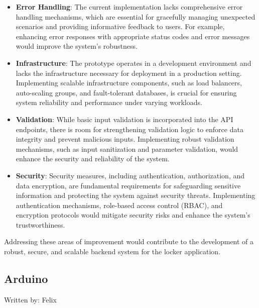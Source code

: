 \begin{itemize}
    \item \textbf{Error Handling}: The current implementation lacks comprehensive error handling mechanisms, which are essential for gracefully managing unexpected scenarios and providing informative feedback to users. For example, enhancing error responses with appropriate status codes and error messages would improve the system's robustness.

    \item \textbf{Infrastructure}: The prototype operates in a development environment and lacks the infrastructure necessary for deployment in a production setting. Implementing scalable infrastructure components, such as load balancers, auto-scaling groups, and fault-tolerant databases, is crucial for ensuring system reliability and performance under varying workloads.

    \item \textbf{Validation}: While basic input validation is incorporated into the API endpoints, there is room for strengthening validation logic to enforce data integrity and prevent malicious inputs. Implementing robust validation mechanisms, such as input sanitization and parameter validation, would enhance the security and reliability of the system.

    \item \textbf{Security}: Security measures, including authentication, authorization, and data encryption, are fundamental requirements for safeguarding sensitive information and protecting the system against security threats. Implementing authentication mechanisms, role-based access control (RBAC), and encryption protocols would mitigate security risks and enhance the system's trustworthiness.
\end{itemize}

Addressing these areas of improvement would contribute to the development of a robust, secure, and scalable backend system for the locker application.

\subsection{Arduino}
{\tiny Written by: Felix}
